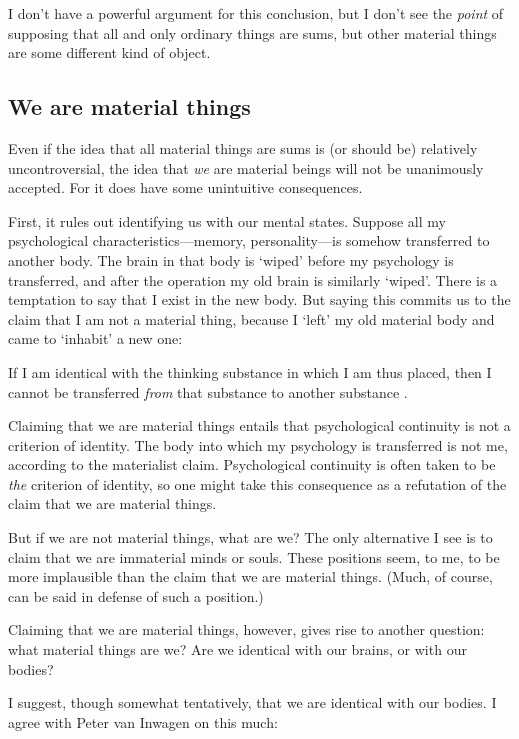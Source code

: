 \documentclass[11pt]{article}
\newenvironment{squote}{%
\begin{spacing}{1}
\begin{list}{}{%
\setlength{\labelwidth}{0pt}%
\rightmargin\leftmargin%
}
\item\relax
}{%
\end{list}%
\end{spacing}
}
\begin{document}
\begin{spacing}{1.5}
I don't have a powerful argument for this conclusion, but I don't see
the {\em point} of supposing that all and only ordinary things are
sums, but other material things are some different kind of object.

\subsection{We are material things}
\label{material-beings}
Even if the idea that all material things are sums is (or should be)
relatively uncontroversial, the idea that {\em we} are material beings
will not be unanimously accepted.  For it does have some unintuitive
consequences.  

First, it rules out identifying us with our mental states.  Suppose
all my psychological characteristics---memory, personality---is
somehow transferred to another body.  The brain in that body is
`wiped' before my psychology is transferred, and after the operation
my old brain is similarly `wiped'.  There is a temptation to say that
I exist in the new body.  But saying this commits us to the claim that
I am not a material thing, because I `left' my old material body and
came to `inhabit' a new one:

\begin{squote}
 If I am identical with the thinking substance in which I am thus
 placed, then I cannot be transferred {\em from} that substance to
 another substance \citep[107]{chisholm1979}.
\end{squote}

Claiming that we are material things entails that psychological
continuity is not a criterion of identity.  The body into which my
psychology is transferred is not me, according to the materialist
claim.  Psychological continuity is often taken to be {\em the}
criterion of identity, so one might take this consequence as a
refutation of the claim that we are material things.

But if we are not material things, what are we?  The only alternative
I see is to claim that we are immaterial minds or souls.  These
positions seem, to me, to be more implausible than the claim that we
are material things.  (Much, of course, can be said in defense of such
a position.)

Claiming that we are material things, however, gives rise to another
question: what material things are we?  Are we identical with our
brains, or with our bodies?

I suggest, though somewhat tentatively, that we are identical with our
bodies.  I agree with Peter van Inwagen on this much:


\end{spacing}
\end{document}
